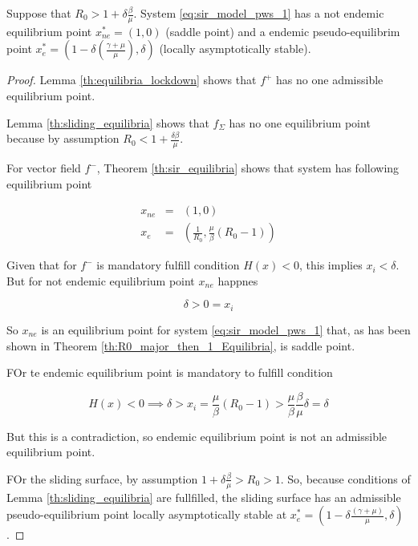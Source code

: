 \begin{theorem}
Suppose that $  R_0 > 1+\delta\frac{\beta}{\mu}$. System \ref{eq:sir_model_pws_1} has a not endemic equilibrium point $x_{ne}^*=(1,0)$ (saddle point) and a endemic pseudo-equilibrim point $x_{e}^*=\left(1-\delta\left(\frac{\gamma+\mu}{\mu}\right), \delta\right)$ (locally asymptotically stable).
\end{theorem}

\begin{proof}
Lemma \ref{th:equilibria_lockdown} shows that $f^+$ has no one admissible equilibrium point.

Lemma \ref{th:sliding_equilibria} shows that $f_\Sigma$ has no one equilibrium point because by assumption $R_0 < 1 + \frac{\delta\beta}{\mu}$.

For vector field $f^-$, Theorem \ref{th:sir_equilibria} shows that system has following equilibrium point

\begin{equation}
    \begin{array}{ccc}
    x_{ne} &=& (1,0) \\
    x_{e} &=& \left(\frac{1}{R_0}, \frac{\mu}{\beta}\left(R_0 - 1\right)\right)
    \end{array}
\end{equation}

Given that for $f^-$ is mandatory fulfill condition $H(x) < 0$, this implies $x_i < \delta$. But for not endemic equilibrium point $x_{ne}$ happnes

\begin{equation}
    \delta > 0 = x_i
\end{equation}

So $x_{ne}$ is an equilibrium point for system \ref{eq:sir_model_pws_1} that, as has been shown in Theorem \ref{th:R0_major_then_1_Equilibria}, is saddle point.

FOr te endemic equilibrium point is mandatory to fulfill condition

\begin{equation}
    H(x) < 0 \implies \delta > x_i = \frac{\mu}{\beta}\left(R_0 - 1\right) > \frac{\mu}{\beta}\frac{\beta}{\mu}\delta = \delta
\end{equation}

But this is a contradiction, so endemic equilibrium point is not an admissible equilibrium point.

FOr the sliding surface, by assumption $ 1+\delta\frac{\beta}{\mu} > R_0 > 1$. So, because conditions of Lemma \ref{th:sliding_equilibria} are fullfilled, the sliding surface has an admissible pseudo-equilibrium point locally asymptotically stable at $x_{e}^*=(1-\delta\frac{\left(\gamma+\mu\right)}{\mu},\delta)$.
\end{proof}